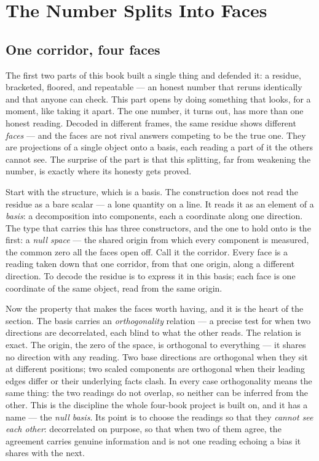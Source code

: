 \chapter{The Number Splits Into Faces}

\section{One corridor, four faces}

The first two parts of this book built a single thing and defended it: a residue, bracketed, floored, and repeatable
--- an honest number that reruns identically and that anyone can check. This part opens by doing something that looks,
for a moment, like taking it apart. The one number, it turns out, has more than one honest reading. Decoded in
different frames, the same residue shows different \emph{faces} --- and the faces are not rival answers competing to be
the true one. They are projections of a single object onto a basis, each reading a part of it the others cannot see.
The surprise of the part is that this splitting, far from weakening the number, is exactly where its honesty gets
proved.

Start with the structure, which is a basis. The construction does not read the residue as a bare scalar --- a lone
quantity on a line. It reads it as an element of a \emph{basis}: a decomposition into components, each a coordinate
along one direction. The type that carries this has three constructors, and the one to hold onto is the first: a
\emph{null space} --- the shared origin from which every component is measured, the common zero all the faces open off.
Call it the corridor. Every face is a reading taken down that one corridor, from that one origin, along a different
direction. To decode the residue is to express it in this basis; each face is one coordinate of the same object, read
from the same origin.

Now the property that makes the faces worth having, and it is the heart of the section. The basis carries an
\emph{orthogonality} relation --- a precise test for when two directions are decorrelated, each blind to what the other
reads. The relation is exact. The origin, the zero of the space, is orthogonal to everything --- it shares no direction
with any reading. Two base directions are orthogonal when they sit at different positions; two scaled components are
orthogonal when their leading edges differ or their underlying facts clash. In every case orthogonality means the same
thing: the two readings do not overlap, so neither can be inferred from the other. This is the discipline the whole
four-book project is built on, and it has a name --- the \emph{null basis}. Its point is to choose the readings so that
they \emph{cannot see each other}: decorrelated on purpose, so that when two of them agree, the agreement carries
genuine information and is not one reading echoing a bias it shares with the next.

